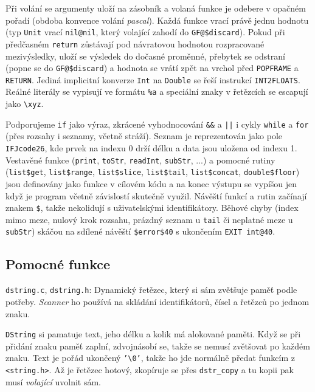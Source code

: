 \documentclass[11pt, a4paper]{article}
\begin{document}
Při volání se argumenty uloží na zásobník a volaná funkce je odebere v opačném pořadí (obdoba konvence volání \emph{pascal}). Každá funkce vrací právě jednu hodnotu (typ \texttt{Unit} vrací \texttt{nil@nil}, který volající zahodí do \texttt{GF@\$discard}). Pokud při předčasném \texttt{return} zůstávají pod návratovou hodnotou rozpracované mezivýsledky, uloží se výsledek do dočasné proměnné, přebytek se odstraní (popne se do \texttt{GF@\$discard}) a hodnota se vrátí zpět na vrchol před \texttt{POPFRAME} a \texttt{RETURN}. Jediná implicitní konverze \texttt{Int} na \texttt{Double} se řeší instrukcí \texttt{INT2FLOATS}. Reálné literály se vypisují ve formátu \texttt{\%a} a speciální znaky v řetězcích se escapují jako \texttt{\textbackslash xyz}.

Podporujeme \texttt{if} jako výraz, zkrácené vyhodnocování \texttt{\&\&} a \texttt{||} i cykly \texttt{while} a \texttt{for} (přes rozsahy i seznamy, včetně stráží). Seznam je reprezentován jako pole \texttt{IFJcode26}, kde prvek na indexu 0 drží délku a data jsou uložena od indexu 1. Vestavěné funkce (\texttt{print}, \texttt{toStr}, \texttt{readInt}, \texttt{subStr}, ...) a pomocné rutiny (\texttt{list\$get}, \texttt{list\$range}, \texttt{list\$slice}, \texttt{list\$tail}, \texttt{list\$concat}, \texttt{double\$floor}) jsou definovány jako funkce v cílovém kódu a na konec výstupu se vypíšou jen když je program včetně závislostí skutečně využil. Návěští funkcí a rutin začínají znakem \texttt{\$}, takže nekolidují s uživatelskými identifikátory. Běhové chyby (index mimo meze, nulový krok rozsahu, prázdný seznam u \texttt{tail} či neplatné meze u \texttt{subStr}) skáčou na sdílené návěští \texttt{\$error\$40} s ukončením \texttt{EXIT int@40}.

\subsection{Pomocné funkce}

\texttt{dstring.c}, \texttt{dstring.h}: Dynamický řetězec, který si sám zvětšuje paměť podle potřeby. \emph{Scanner} ho používá na skládání identifikátorů, čísel a řetězců po jednom znaku.

\texttt{DString} si pamatuje text, jeho délku a kolik má alokované paměti. Když se při přidání znaku paměť zaplní, zdvojnásobí se, takže se nemusí zvětšovat po každém znaku. Text je pořád ukončený \texttt{'\textbackslash 0'}, takže ho jde normálně předat funkcím z \texttt{<string.h>}. Až je řetězec hotový, zkopíruje se přes \texttt{dstr\_copy} a tu kopii pak musí \emph{volající} uvolnit sám.
\end{document}
